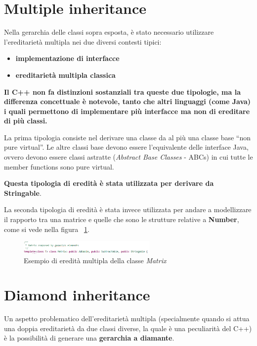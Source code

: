 \section{Multiple inheritance}
Nella gerarchia delle classi sopra esposta, è stato necessario utilizzare l’ereditarietà multipla
nei due diversi contesti tipici: 
\begin{itemize}
	\item \textbf{implementazione di interfacce}
	\item \textbf{ereditarietà multipla classica}
\end{itemize}

\textbf{Il C++ non fa distinzioni sostanziali tra queste due tipologie, ma la differenza concettuale è
notevole, tanto che altri linguaggi (come Java) i quali permettono di implementare più interfacce ma non di ereditare di più classi.}

La prima tipologia consiste nel derivare una classe da al più una classe base “non pure virtual”.
Le altre classi base devono essere l’equivalente delle interface Java, ovvero devono essere
classi astratte (\textit{Abstract Base Classes} - ABCs) in cui tutte le member functions sono
pure virtual.

\textbf{Questa tipologia di eredità è stata utilizzata per derivare da Stringable}.

La seconda tipologia di eredità è stata invece utilizzata per andare a modellizzare il rapporto tra una matrice e quelle che sono le strutture relative a \textbf{Number}, come si vede nella figura ~\ref{fig:MultipleInerithance}.

\begin{figure}[h]
	\centering
	\includegraphics[width=0.6\textwidth]{Immagini/MultipleInerithance.png}
	\caption{Esempio di eredità multipla della classe \textit{Matrix}}
	\label{fig:MultipleInerithance}
\end{figure}

\section{Diamond inheritance}
Un aspetto problematico dell’ereditarietà multipla (specialmente quando si attua una doppia ereditarietà da due classi diverse, la quale è una peculiarità del C++) è la
possibilità di generare una \textbf{gerarchia a diamante}.

